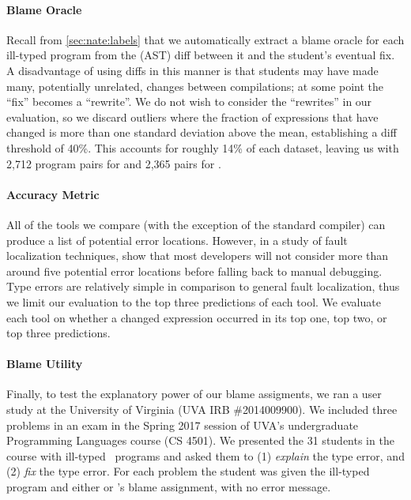 \paragraph{Blame Oracle}
Recall from \autoref{sec:nate:labels} that we automatically extract a blame
oracle for each ill-typed program from the (AST) diff between it and the
student's eventual fix.
%
A disadvantage of using diffs in this manner is that students may have
made many, potentially unrelated, changes between compilations; at some
point the ``fix'' becomes a ``rewrite''.
%
We do not wish to consider the ``rewrites'' in our evaluation, so we
discard outliers where the fraction of expressions that have changed is
more than one standard deviation above the mean, establishing a diff
threshold of 40\%.
%
This accounts for roughly 14\% of each dataset, leaving us with
2,712 program pairs for \SPRING and 2,365 pairs for \FALL.



\paragraph{Accuracy Metric}
All of the tools we compare (with the exception of the standard \ocaml
compiler) can produce a list of potential error locations.
%
However, in a study of fault localization techniques,
\citet{Kochhar2016-oc} show that most developers will not consider more
than around five potential error locations before falling back to manual
debugging.
%
Type errors are relatively simple in comparison to general fault
localization, thus we limit our evaluation to the top three predictions
of each tool.
%
We evaluate each tool on whether a changed expression occurred in its
top one, top two, or top three predictions.

\paragraph{Blame Utility}
Finally, to test the explanatory power of our blame assigments, we
ran a user study at the University of Virginia (UVA IRB \#2014009900).
%
We included three problems in an exam in the Spring 2017 session of UVA's
undergraduate Programming Languages course (CS 4501).
%
We presented the 31 students in the course with ill-typed \ocaml\
programs and asked them to
%
(1) \emph{explain} the type error, and
%
(2) \emph{fix} the type error.
%
For each problem the student was given the ill-typed program and
either \sherrloc or \toolname's blame assignment, with no error message.








